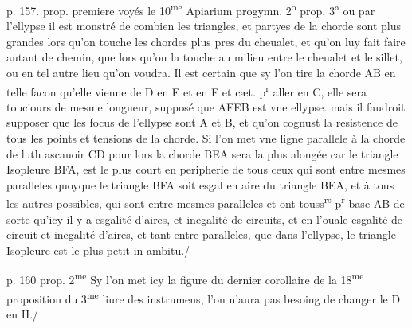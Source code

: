 \documentclass[11pt,a4paper]{article}
\begin{document}
p. 157. prop. premiere
voyés le 10\textsuperscript{me} Apiarium progymn. 2\textsuperscript{o} prop. 3\textsuperscript{a} ou par l'ellypse il est monstré de combien les triangles, et partyes de la chorde sont plus grandes lors qu'on touche les chordes plus pres du cheualet, et qu'on luy fait faire autant de chemin, que lors qu'on la touche au milieu entre le cheualet et le sillet, ou en tel autre lieu qu'on voudra. Il est certain que sy l'on tire la chorde AB en telle facon qu'elle vienne de D en E et en F et cæt. p\textsuperscript{r} aller en C, elle sera touciours de mesme longueur, supposé que AFEB est vne ellypse. mais il faudroit supposer que les focus de l'ellypse sont A et B, et qu'on cognust la resistence de tous les points et tensions de la chorde.
Si l'on met vne ligne parallele à la chorde de luth ascauoir CD pour lors la chorde BEA sera la plus alongée car le triangle Isopleure BFA, est le plus court en peripherie de tous ceux qui sont entre mesmes paralleles quoyque le triangle BFA soit esgal en aire du triangle BEA, et à tous les autres possibles, qui sont entre mesmes paralleles et ont touss\textsuperscript{rs} p\textsuperscript{r} base AB de sorte qu'icy il y a esgalité d'aires, et inegalité de circuits, et en l'ouale esgalité de circuit et inegalité d'aires, et tant entre paralleles, que dans l'ellypse, le triangle Isopleure est le plus petit in ambitu./

p. 160 prop. 2\textsuperscript{me}
Sy l'on met icy la figure du dernier corollaire de la 18\textsuperscript{me} proposition du 3\textsuperscript{me} liure des instrumens, l'on n'aura pas besoing de changer le D en H./

\end{document}
